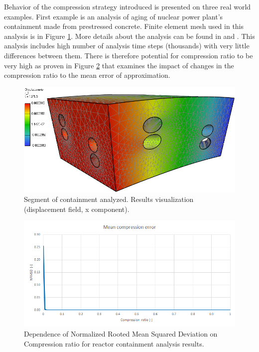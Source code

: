Behavior of the compression strategy introduced is presented on three real world examples. First example is an analysis of aging of nuclear power plant's containment made from prestressed concrete. Finite element mesh used in this analysis is in Figure \ref{fig:temelin:mesh}. More details about the analysis can be found in \cite{Kruis2012} and \cite{Koudelka2009}. This analysis includes high number of analysis time steps (thousands) with very little differences between them. There is therefore potential for compression ratio to be very high as proven in Figure \ref{fig:temelin:NRMSD} that examines the impact of changes in the compression ratio to the mean error of approximation.

\begin{figure}[H]
\centering
\includegraphics[width=\textwidth]{figures/appendix-SVD/temelin_screenshot}
\decoRule
\caption{Segment of containment analyzed. Results visualization (displacement field, x component).}
\label{fig:temelin:mesh}
\end{figure}

\begin{figure}[H]
\centering
\includegraphics[width=\textwidth]{figures/appendix-SVD/temelin_NRMSD}
\decoRule
\caption{Dependence of Normalized Rooted Mean Squared Deviation on Compression ratio for reactor containment analysis results.}
\label{fig:temelin:NRMSD}
\end{figure}


